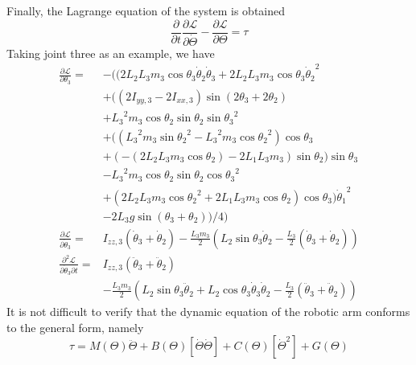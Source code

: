 \documentclass{article}
\begin{document}
Finally, the Lagrange equation of the system is obtained
\[
    \frac{\partial}{\partial t} \frac{\partial \mathcal L}{\partial \dot \Theta} - \frac{\partial \mathcal L}{\partial \Theta} = \tau
\]
Taking joint three as an example, we have
\[
    \begin{aligned}
        \frac{\partial \mathcal L}{\partial \theta_3}
        = &
         - ((2 {L_2} {L_3} {m_3} \cos\theta_3 \dot\theta_2 \dot\theta_3 + 2 {L_2} {L_3} {m_3} \cos\theta_3 {{\dot\theta_2}^{2}}
         \\ &
         + (\left( 2 I_{yy,3} - 2 I_{xx,3}\right)  \sin{\left( 2 {{\theta }_3} + 2 {{\theta }_2}\right) }
         \\ &
         + {{{L_3}}^{2}} {m_3} \cos\theta_2 \sin\theta_2 {{\sin\theta_3}^{2}}
         \\ &
         + (\left( {{{L_3}}^{2}} {m_3} {{\sin\theta_2}^{2}} - {{{L_3}}^{2}} {m_3} {{\cos\theta_2}^{2}}\right)  \cos\theta_3
         \\ &
         + \left(  - \left( 2 {L_2} {L_3} {m_3} \cos\theta_2\right)  - 2 {L_1} {L_3} {m_3}\right)  \sin\theta_2) \sin\theta_3
         \\ &
         - {{{L_3}}^{2}} {m_3} \cos\theta_2 \sin\theta_2 {{\cos\theta_3}^{2}}
         \\ &
         + \left( 2 {L_2} {L_3} {m_3} {{\cos\theta_2}^{2}} + 2 {L_1} {L_3} {m_3} \cos\theta_2\right)  \cos\theta_3) {{\dot\theta_1}^{2}}
         \\ &
         - 2 {L_3} g \sin{\left( {{\theta }_3} + {{\theta }_2}\right) })/4)\mbox{}
        \\
        \frac{\partial \mathcal L}{\partial \dot\theta_3}
        = &
        {I_{zz,3}} (\dot\theta_3 + \dot\theta_2) - \frac{{L_3} {m_3}}{2} \left( {L_2} \sin\theta_3 \dot\theta_2 - \frac{{L_3}  }{2} (\dot\theta_3 + \dot\theta_2) \right)
        \\
        \frac{\partial^2 \mathcal L}{\partial \dot \theta_3 \partial t}
        = & I_{zz,3} (\ddot\theta_3 + \ddot\theta_2)
        \\ &
        - \frac{L_3 m_3}{2} \left( L_2 \sin \theta_3 \ddot \theta_2 + L_2 \cos \theta_3 \dot\theta_3 \dot\theta_2
        - \frac{L_3}{2} (\ddot\theta_3 + \ddot\theta_2) \right)
    \end{aligned}
\]
It is not difficult to verify that the dynamic equation of the robotic arm conforms to the general form, namely
\begin{equation}
    \label{eqn:dynamics}
    \tau = M(\Theta) \ddot \Theta + B(\Theta) [\dot\Theta \dot\Theta] + C(\Theta) [\dot\Theta^2] + G(\Theta)
\end{equation}
\end{document}

